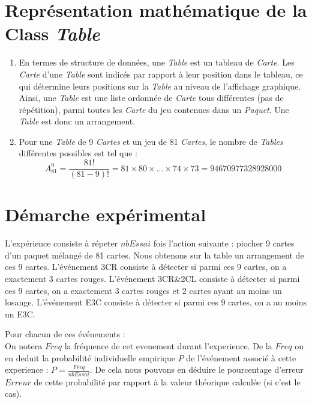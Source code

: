 \documentclass{report}
\begin{document}
\section{Représentation mathématique de la Class \it Table}
\begin{enumerate}
	\item[\fcolorbox{black}{black}{\textbf{\textcolor{white}{4}}}] 
	En termes de structure de données, une \textit{Table} est un tableau de \textit{Carte}. Les \textit{Carte} d'une \textit{Table} sont indicés par rapport à leur position dans le tableau, ce qui détermine leurs positions sur la \textit{Table} au niveau de l'affichage graphique. Ainsi, une \textit{Table} est une liste ordonnée de \textit{Carte} tous différentes (pas de répétition), parmi toutes les \textit{Carte} du jeu contenues dans un \textit{Paquet}. Une \textit{Table} est donc un arrangement. 
	
	\item[\fcolorbox{black}{black}{\textbf{\textcolor{white}{5}}}] 
	Pour une \textit{Table} de 9 \textit{Cartes} et un jeu de 81 \textit{Cartes}, le nombre de \textit{Tables} différentes possibles est tel que : 
	\bigskip
	$$A^{9}_{81} = \frac{81!}{(81-9)!} = 81\times80\times...\times74\times73 = 94670977328928000$$
\end{enumerate}

\section{Démarche expérimental}
\qquad L'expérience consiste à répeter $nbEssai$ fois l'action suivante : piocher 9 cartes d'un paquet mélangé de 81 cartes. Nous obtenons sur la table un arrangement de ces 9 cartes. L'événement 3CR consiste à détecter si parmi ces 9 cartes, on a exactement 3 cartes rouges. L'événement 3CR\&2CL consiste à détecter si parmi ces 9 cartes, on a exactement 3 cartes rouges et 2 cartes ayant au moins un losange. L'événement E3C consiste à détecter si parmi ces 9 cartes, on a au moins un E3C.
\bigskip

\noindent Pour chacun de ces événements : \\
On notera $Freq$ la fréquence de cet evenement durant l'experience.
De la $Freq$ on en deduit la probabilité individuelle empirique $P$ de l'événement associé à cette experience : $P=\frac{Freq}{nbEssai}$.
De cela nous pouvons en déduire le pourcentage d'erreur $Erreur$ de cette probabilité par rapport à la valeur théorique calculée (si c'est le cas).
\bigskip
\end{document}
